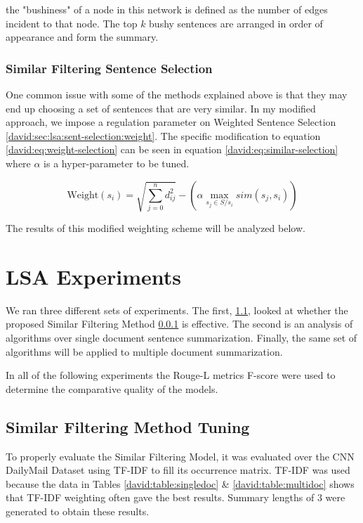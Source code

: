 \documentclass[../writeup.tex]{subfiles}
\begin{document}
the "bushiness" of a node in this network is defined as the number of edges incident to that node. The top $k$ bushy sentences are arranged in order of appearance and form the summary.

\subsubsection{Similar Filtering Sentence Selection} \label{david:sec:lsa:sent-selection:similar}

One common issue with some of the methods explained above is that they may end up choosing a set of sentences that are very similar. In my modified approach, we impose a regulation parameter on Weighted Sentence Selection \ref{david:sec:lsa:sent-selection:weight}.
The specific modification to equation \ref{david:eq:weight-selection} can be seen in equation \ref{david:eq:similar-selection} where $\alpha$ is a hyper-parameter to be tuned.

\begin{equation} \label{david:eq:similar-selection}
    \text{Weight}(s_i)= \sqrt{\sum_{j=0}^n d_{ij}^2} - \left(\alpha \max_{s_j \in S/s_i} sim(s_j, s_i)\right)
\end{equation}

The results of this modified weighting scheme will be analyzed below.


\section{LSA Experiments}\label{david:sec:experiments}

We ran three different sets of experiments. The first, \ref{david:sec:experiments:similar}, looked at whether the proposed Similar Filtering Method \ref{david:sec:lsa:sent-selection:similar} is effective.
The second is an analysis of algorithms over single document sentence summarization. Finally, the same set of algorithms will be applied to multiple document summarization.

In all of the following experiments the Rouge-L metrics F-score were used to determine the comparative quality of the models.

\subsection{Similar Filtering Method Tuning}\label{david:sec:experiments:similar}

To properly evaluate the Similar Filtering Model, it was evaluated over the CNN DailyMail Dataset using TF-IDF to fill its occurrence matrix.
TF-IDF was used because the data in Tables \ref{david:table:singledoc} \& \ref{david:table:multidoc} shows that TF-IDF weighting often gave the best results. Summary lengths of $3$ were generated to obtain these results.
\end{document}

